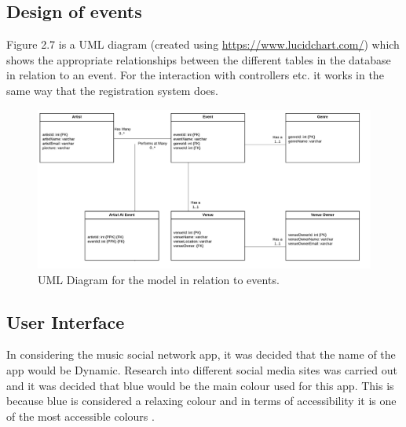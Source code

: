 \subsection{Design of events}

Figure 2.7 is a UML diagram (created using \url{https://www.lucidchart.com/}) which shows the appropriate relationships between the different tables in the database in relation to an event. For the interaction with controllers etc. it works in the same way that the registration system does.
\begin{center}
\begin{figure}[H]
\includegraphics[width=\textwidth,height=\textheight,keepaspectratio]{images/events}
\caption{UML Diagram for the model in relation to events.}
\end{figure}
\end{center}


\subsection{User Interface}
In considering the music social network app, it was decided that the name of the app would be Dynamic. Research into different social media sites was carried out and it was decided that blue would be the main colour used for this app. This is because blue is considered a relaxing colour and in terms of accessibility it is one of the most accessible colours \cite{col}.
